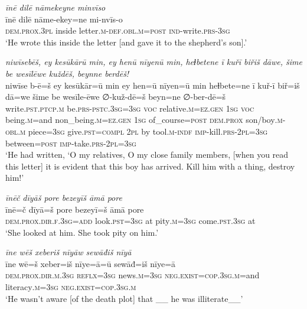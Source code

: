 \ea \label{KŠ.57}
\textit{īnē dilē nāmekeyne minvīso} \\ 
\gll īnē dilē nāme-ekey=ne mi-nvīs-o \\ 
 \textsc{dem.prox}\textsc{.3pl} inside letter\textsc{.m}\textsc{-def}\textsc{.obl}\textsc{.m}\textsc{=\textsc{post}} \textsc{ind-}write\textsc{.prs}\textsc{-3sg} \\ 
\glt `He wrote this inside the letter [and gave it to the shepherd’s son].'
\z 
 
\ea \label{KŠ.72}
\textit{niwīsebēš, ey kesūkārū min, ey henū nīyenū min, heɫbetene ī kuřī biřiš dāwe, šime be wesīlēwe kuždēš, beynne berdēš!} \\ 
\gll niwīse b-ē=š ey kesūkār=ū min ey hen=ū nīyen=ū min heɫbete=ne ī kuř-ī biř=iš dā=we šime be wesīle-ēwe ∅-kuž-dē=š beyn=ne ∅-ber-dē=š \\ 
 write\textsc{.pst}\textsc{.ptcp}\textsc{.m} be\textsc{.prs}\textsc{-pstc}\textsc{.3sg}\textsc{=3sg} \textsc{voc} relative\textsc{.m}\textsc{\textsc{=ez.gen}} \textsc{1sg} \textsc{voc} being\textsc{.m}=and non\_being\textsc{.m}\textsc{\textsc{=ez.gen}} \textsc{1sg} of\_course\textsc{=\textsc{post}} \textsc{dem.prox} son/boy\textsc{.m}\textsc{-obl}\textsc{.m} piece\textsc{=3sg} give\textsc{.pst}\textsc{=compl} \textsc{2pl} by tool\textsc{.m}\textsc{-indf} \textsc{imp-}kill\textsc{.prs}-\textsc{2pl}\textsc{=3sg} between\textsc{=\textsc{post}} \textsc{imp-}take\textsc{.prs}-\textsc{2pl}\textsc{=3sg} \\ 
\glt `He had written, ‘O my relatives, O my close family members, [when you read this letter] it is evident that this boy has arrived. Kill him with a thing, destroy him!'
\z 
 
\ea \label{KŠ.73}
\textit{īnēč dīyāš pore bezeyīš āmā pore} \\ 
\gll īnē=č dīyā=š pore bezeyī=š āmā pore \\ 
 \textsc{dem.prox}\textsc{.dir}\textsc{.f}\textsc{.3sg}\textsc{=add} look\textsc{.pst}\textsc{=3sg} at pity\textsc{.m}\textsc{=3sg} come\textsc{.pst}\textsc{.3sg} at \\ 
\glt `She looked at him. She took pity on him.'
\z 
 
\ea \label{KŠ.76}
\textit{īne wēš xeberiš nīyāw sewāđiš nīyā} \\ 
\gll īne wē=š xeber=iš nīye=ā=ū sewāđ=iš nīye=ā \\ 
 \textsc{dem.prox}\textsc{.dir}\textsc{.m}\textsc{.3sg} \textsc{reflx}\textsc{=3sg} news\textsc{.m}\textsc{=3sg} \textsc{\textsc{neg.}exist}\textsc{=cop}\textsc{.3sg}\textsc{.m}=and literacy\textsc{.m}\textsc{=3sg} \textsc{\textsc{neg.}exist}\textsc{=cop}\textsc{.3sg}\textsc{.m} \\ 
\glt `He wasn’t aware [of the death plot] that \_\_ he was illiterate\_\_'
\z 
 
